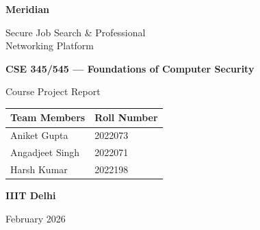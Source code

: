 \documentclass[12pt, a4paper]{article}
\begin{document}
\begin{titlepage}
    \centering
    \vspace*{2cm}

    {\Huge\bfseries\textcolor{meridiandark}{Meridian}\par}
    \vspace{0.5cm}
    {\Large\textcolor{meridianblue}{Secure Job Search \& Professional\\Networking Platform}\par}

    \vspace{2cm}

    {\large\textbf{CSE 345/545 — Foundations of Computer Security}\par}
    {\large Course Project Report\par}

    \vspace{1.5cm}

    \begin{tabular}{ll}
        \toprule
        \textbf{Team Members} & \textbf{Roll Number} \\
        \midrule
        Aniket Gupta    & 2022073 \\
        Angadjeet Singh & 2022071 \\
        Harsh Kumar     & 2022198 \\
        \bottomrule
    \end{tabular}

    \vspace{2cm}

    {\large\textbf{IIIT Delhi}\par}
    {\large February 2026\par}

\end{titlepage}

\newpage
\tableofcontents
\newpage


\newpage

\newpage

\newpage

\newpage

\newpage

\newpage

\end{document}
